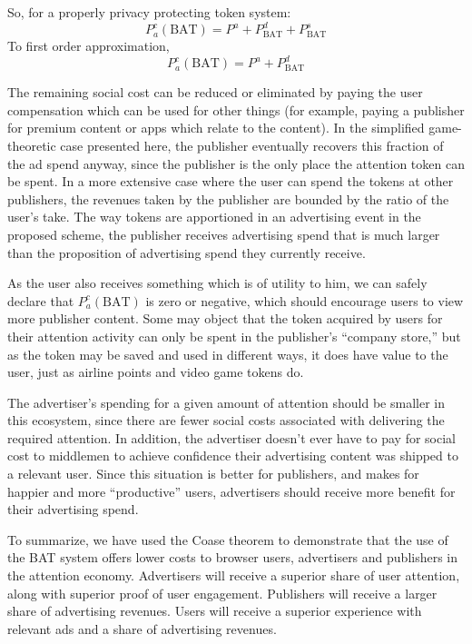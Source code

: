 \documentclass[11pt]{article}
\begin{document}
So, for a properly privacy protecting token system: 
  \[P^{c}_a(\textrm{BAT}) = P^{a} + P^{d}_{\textrm{BAT}} + P^{s}_{\textrm{BAT}}\]
  To first order approximation,  
  \[P^{c}_a(\textrm{BAT}) = P^{a} + P^{d}_{\textrm{BAT}} \]

The remaining social cost can be reduced or eliminated by paying the
user compensation which can be used for other things (for example,
paying a publisher for premium content or apps which relate to the
content). In the simplified game-theoretic case presented here, the
publisher eventually recovers this fraction of the ad spend anyway,
since the publisher is the only place the attention token can be
spent. In a more extensive case where the user can spend the tokens at
other publishers, the revenues taken by the publisher are bounded by
the ratio of the user's take. The way tokens are apportioned in an
advertising event in the proposed scheme, the publisher receives
advertising spend that is much larger than the proposition of
advertising spend they currently receive.

As the user also receives something which is of utility to him, we can
safely declare that $P^{c}_a(\textrm{BAT})$ is zero or negative, which should encourage users
to view more publisher content. Some may object that the token
acquired by users for their attention activity can only be spent in
the publisher's ``company store,'' but as the token may be saved and
used in different ways, it does have value to the user, just as
airline points and video game tokens do.

The advertiser's spending for a given amount of attention should be
smaller in this ecosystem, since there are fewer social costs
associated with delivering the required attention. In addition, the
advertiser doesn't ever have to pay for social cost to middlemen to
achieve confidence their advertising content was shipped to a relevant
user. Since this situation is better for publishers, and makes for
happier and more ``productive'' users, advertisers should receive more
benefit for their advertising spend.

To summarize, we have used the Coase theorem to demonstrate that the
use of the \textrm{BAT} system offers lower costs to browser users, advertisers
and publishers in the attention economy. Advertisers will receive a
superior share of user attention, along with superior proof of user
engagement. Publishers will receive a larger share of advertising
revenues. Users will receive a superior experience with relevant ads
and a share of advertising revenues.
\end{document}
